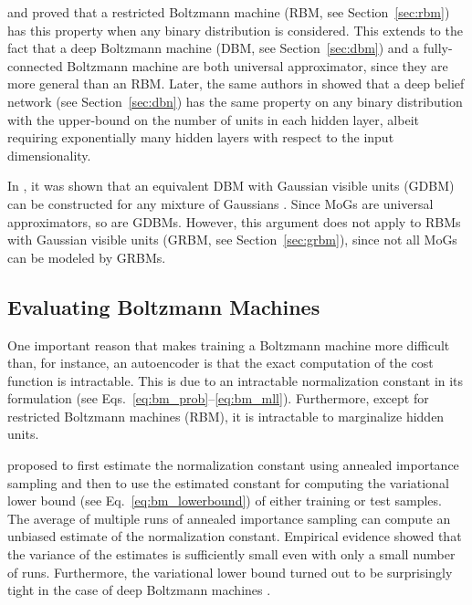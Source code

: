 \documentclass[dissertation,nocontribution]{aaltoseries}
\begin{document}
\citet{Roux2008} and \citet{Freund1994}  proved that a
restricted Boltzmann machine (RBM, see
Section~\ref{sec:rbm}) has this property when any binary
distribution is considered. This extends to the
fact that a deep Boltzmann machine (DBM, see
Section~\ref{sec:dbm}) and a fully-connected Boltzmann
machine are both universal approximator, since they are more
general than an RBM.  Later, the same authors in
\citep{Roux2010} showed that a deep belief network (see
Section~\ref{sec:dbn}) has the same property on any binary
distribution with the upper-bound on the number of units in
each hidden layer, albeit requiring exponentially many
hidden layers with respect to the input dimensionality. 

In , it was shown that an equivalent
DBM with Gaussian visible units (GDBM) can be constructed for any
mixture of Gaussians \citep[MoG, see, e.g.,][]{Bishop2006}.
Since MoGs are universal approximators, so are GDBMs.
However, this argument does not apply to RBMs with Gaussian
visible units (GRBM, see Section~\ref{sec:grbm}), since not
all MoGs can be modeled by GRBMs.

\subsection{Evaluating Boltzmann Machines}
\label{sec:eval_bm}

One important reason that makes training a Boltzmann machine
more difficult than, for instance, an autoencoder is that
the exact computation of the cost function is intractable.
This is 
due to an intractable
normalization constant in its formulation (see
Eqs.~\eqref{eq:bm_prob}--\eqref{eq:bm_mll}). Furthermore, except
for restricted Boltzmann machines (RBM), it is intractable to
marginalize hidden units.

\citet{Salakhutdinov2008a} proposed to first estimate the
normalization constant using annealed importance sampling
\citep{Neal1998} and then to use the estimated constant for
computing the variational lower bound (see
Eq.~\eqref{eq:bm_lowerbound}) of either training or test
samples. The average of multiple runs of annealed
importance sampling can compute an unbiased estimate of the
normalization constant. Empirical evidence
\citep{Salakhutdinov2008} showed that the variance of the
estimates is sufficiently small even with only a small
number of runs.  Furthermore, the variational lower bound
turned out to be surprisingly tight in the case of deep
Boltzmann machines \citep{Salakhutdinov2012nc}.
\end{document}
